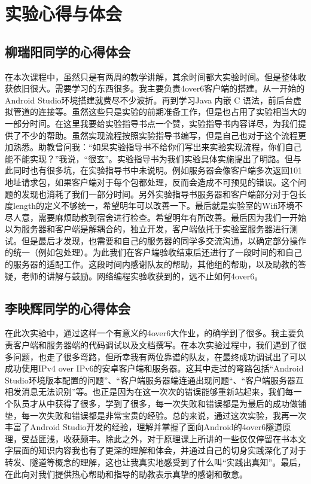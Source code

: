 \chapter{实验心得与体会}

\section{柳瑞阳同学的心得体会}
在本次课程中，虽然只是有两周的教学讲解，其余时间都大实验时间。但是整体收获依旧很大。需要学习的东西很多。我主要负责4over6客户端的搭建。从一开始的Android Studio环境搭建就费尽不少波折。再到学习Java 内嵌 C 语法，前后台虚拟管道的连接等。虽然这些只是实验的前期准备工作，但是也占用了实验相当大的一部分时间。在这里我要给实验指导书点一个赞，实验指导书内容详尽，为我们提供了不少的帮助。虽然实现流程按照实验指导书编写，但是自己也对于这个流程更加熟悉。助教曾问我：“如果实验指导书不给你们写出来实验实现流程，你们自己能不能实现？”我说，“很玄”。实验指导书为我们实验具体实施提出了明路。但与此同时也有很多坑，在实验指导书中未说明。例如服务器会像客户端多次返回101地址请求包，如果客户端对于每个包都处理，反而会造成不可预见的错误。这个问题的发现也消耗了我们一部分时间。另外实验指导书服务器和客户端部分对于包长度length的定义不够统一，希望明年可以改善一下。最后就是实验室的Wifi环境不尽人意，需要麻烦助教到宿舍进行检查。希望明年有所改善。最后因为我们一开始以为服务器和客户端是解耦合的，独立开发，客户端依托于实验室服务器进行测试。但是最后才发现，也需要和自己的服务器的同学多交流沟通，以确定部分操作的统一（例如包处理）。为此我们在客户端验收结束后还进行了一段时间的和自己的服务器的适配工作。这段时间内感谢队友的帮助，其他组的帮助，以及助教的答疑，老师的讲解与鼓励。网络编程实验收获到的，远不止如何4over6。

\section{李映辉同学的心得体会}
在此次实验中，通过这样一个有意义的4over6大作业，的确学到了很多。我主要负责客户端和服务器端的代码调试以及文档撰写。在本次实验过程中，我们遇到了很多问题，也走了很多弯路，但所幸我有两位靠谱的队友，在最终成功调试出了可以成功使用IPv4 over IPv6的安卓客户端和服务器。这其中走过的弯路包括“Android Studio环境版本配置的问题”、“客户端服务器端连通出现问题“、“客户端服务器互相发消息无法识别”等。也正是因为在这一次次的错误能够重新站起来，我们每一个队员才从中获得了很多，学到了很多，每一次失败和错误都是为最后的成功做铺垫，每一次失败和错误都是非常宝贵的经验。总的来说，通过这次实验，我再一次丰富了Android Studio开发的经验，理解并掌握了面向Android的4over6隧道原理，受益匪浅，收获颇丰。除此之外，对于原理课上所讲的一些仅仅停留在书本文字层面的知识内容我也有了更深的理解和体会，并通过自己的切身实践深化了对于转发、隧道等概念的理解，这也让我真实地感受到了什么叫“实践出真知”。最后，在此向对我们提供热心帮助和指导的助教表示真挚的感谢和敬意。

